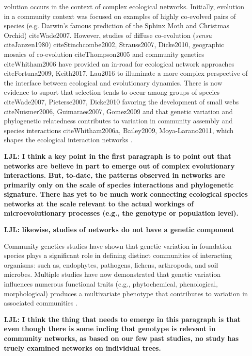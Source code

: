 \documentclass[11pt,twocolumn,twoside,lineno]{pnas-new}
\begin{document}
volution occurs in the context of complex ecological
networks. Initially, evolution in a community context was focused on
examples of highly co-evolved pairs of species (e.g. Darwin's famous
prediction of the Sphinx Moth and Christmas Orchid)
cite{Wade2007}. However, studies of diffuse co-evolution
(\textit{sensu} cite{Janzen1980}) cite{Stinchcombe2002, Strauss2007,
  Dicke2010}, geographic mosaics of co-evolution cite{Thompson2005}
and community genetics cite{Whitham2006} have provided an in-road for
ecological network approaches cite{Fortuna2009, Keith2017, Lau2016}
to illuminate a more complex perspective of the interface between
ecological and evolutionary dynamics. There is now evidence to suport
that selection tends to occur among groups of species cite{Wade2007,
  Pieterse2007, Dicke2010} favoring the development of small webs
cite{Nuismer2006, Guimaraes2007, Gomez2009} and that genetic
variation and phylogenetic relatedness contributes to variation in
community assembly \cite{Crutsinger2016} and species interactions
cite{Whitham2006a, Bailey2009, Moya-Larano2011}, which shapes the
ecological interaction networks \cite{Rezende2007}.

\textbf{LJL: I think a key point in the first paragraph is to point
  out that networks are believe in part to emerge out of complex
  evolutionary interactions. But, to-date, the patterns observed in
  networks are primarily only on the scale of species interactions and
  phylogenetic signature. There has yet to be much work connecting
  ecological species networks at the scale relevant to the actual
  workings of microevolutionary processes (e.g., the genotype or
  population level).}

\textbf{LJL: likewise, studies of networks do not have a genetic
  component}


Community genetics studies \cite{Lamit2015a} have shown that
genetic variation in foundation species \cite{Ellison2005} plays a
significant role in defining distinct communities of interacting
organisms:  such as, endophytes, pathogens, lichens, arthropods, and
soil microbes. Multiple studies have now demonstrated that genetic
variation influences numerous functional traits (e.g., phytochemical,
phenological, morphological) produces a multivariate phenotype
\cite{holeski2012} that contributes to variation in associated
communities \cite{Bailey2009a}.

\textbf{LJL: I think the thing that needs to emerge in this paragraph
  is that even though there is some incling that genotype is relevant
  in community networks, as based on our few past studies, no study
  has truely examined networks on individual trees.}
\end{document}

